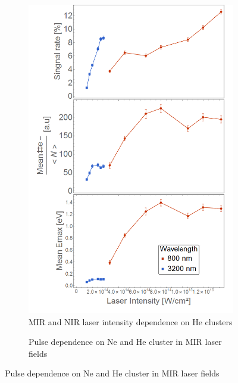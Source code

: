 \begin{figure}[h!]
\hfill
\begin{subfigure}[l]{0.48\textwidth}
\caption{MIR and NIR laser intensity dependence on He clusters}
\includegraphics[width=1\textwidth]{../Images/results/Comparison_energyDistribution/Comp_Laser intensity.png} 
\end{subfigure} 
\begin{subfigure}[l]{0.48\textwidth}
\caption{Pulse dependence on Ne and He cluster in MIR laser fields}

\end{subfigure}
\end{figure}
